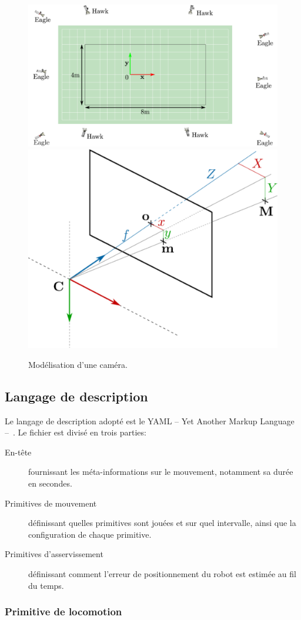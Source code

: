 \begin{figure}
  \begin{center}
    \includegraphics[width=.45\linewidth]{src/chap3-primitive-mouvement/cameraSetUp.pdf}
    \includegraphics[width=.45\linewidth]{src/chap3-primitive-mouvement/cameraProj.pdf}
  \end{center}
  \caption{Modélisation d'une caméra.}
\end{figure}




\subsection{Langage de description}

Le langage de description adopté est le YAML -- Yet Another Markup
Language --~\citep{yaml}. Le fichier est divisé en trois parties:
\begin{description}
\item[En-tête] fournissant les méta-informations sur le mouvement, notamment sa durée en secondes.
\item[Primitives de mouvement] définissant quelles primitives sont
  jouées et sur quel intervalle, ainsi que la configuration de chaque
  primitive.
\item[Primitives d'asservissement] définissant comment l'erreur de
  positionnement du robot est estimée au fil du temps.
\end{description}


\subsubsection{Primitive de locomotion}

